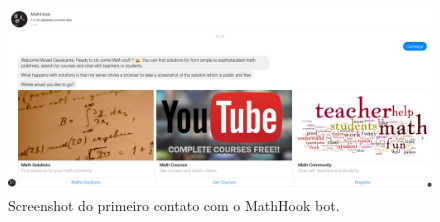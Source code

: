 \begin{figure}[h!tbp]
    \centering
    \includegraphics[width=1\linewidth]{img/bot1_1.png}
    \caption{Screenshot do primeiro contato com o MathHook bot.}
    \label{fig:bot1_1}
\end{figure}
